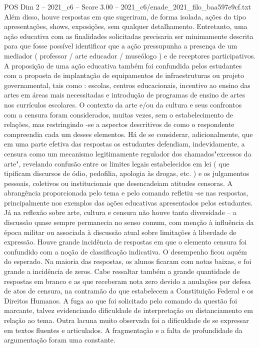 \begin{textsample}{POS Dim 2 – 2021\_c6 – Score 3.00 – 2021\_c6/enade\_2021\_filo\_baa597e9cf.txt}
Além disso, houve respostas em que sugeriram, de forma isolada, ações do tipo apresentações, shows, exposições, sem qualquer detalhamento.
Entretanto, uma ação educativa com as finalidades solicitadas precisaria ser minimamente descrita para que fosse possível identificar que a ação pressupunha a presença de um mediador ( professor / arte educador / museólogo ) e de receptores participativos.
A proposição de uma ação educativa também foi confundida pelos estudantes com a proposta de implantação de equipamentos de infraestruturas ou projeto governamental, tais como : escolas, centros educacionais, incentivo ao ensino das artes em áreas mais necessitadas e introdução de programas de ensino de artes nos currículos escolares.
O contexto da arte e/ou da cultura e seus confrontos com a censura foram considerados, muitas vezes, sem o estabelecimento de relações, mas restringindo -se a aspectos descritivos de como o respondente compreendia cada um desses elementos.
Há de se considerar, adicionalmente, que em uma parte efetiva das respostas os estudantes defendiam, indevidamente, a censura como um mecanismo legitimamente regulador dos chamados"excessos da arte", revelando confusão entre os limites legais estabelecidos em lei ( que tipificam discursos de ódio, pedofilia, apologia às drogas, etc. ) e os julgamentos pessoais, coletivos ou institucionais que desencadeiam atitudes censoras.
A abrangência proporcionada pelo tema e pelo comando refletiu -se nas respostas, principalmente nos exemplos das ações educativas apresentados pelos estudantes.
Já na reflexão sobre arte, cultura e censura não houve tanta diversidade – a discussão quase sempre permanecia no senso comum, com menção à influência da época militar ou associada à discussão atual sobre limitações à liberdade de expressão.
Houve grande incidência de respostas em que o elemento censura foi confundido com a noção de classificação indicativa.
O desempenho ficou aquém do esperado.
Na maioria das respostas, os alunos ficaram com notas baixas, e foi grande a incidência de zeros.
Cabe ressaltar também a grande quantidade de respostas em branco e as que receberam nota zero devido a anulações por defesa de atos de censura, na contramão do que estabelecem a Constituição Federal e os Direitos Humanos.
A fuga ao que foi solicitado pelo comando da questão foi marcante, talvez evidenciando dificuldade de interpretação ou distanciamento em relação ao tema.
Outra lacuna muito observada foi a dificuldade de se expressar em textos fluentes e articulados.
A fragmentação e a falta de profundidade da argumentação foram uma constante.

\end{textsample}
